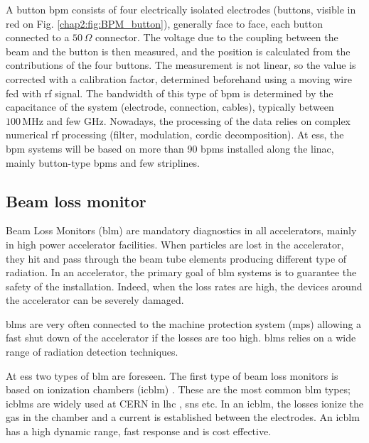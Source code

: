\begin{refsection}
  
  A button \acrshort{bpm} consists of four electrically isolated electrodes (buttons, visible in red on Fig. \ref{chap2:fig:BPM_button}), generally face to face, each button connected to a $50\,\Omega$ connector. The voltage due to the coupling between the beam and the button is then measured, and the position is calculated from the contributions of the four buttons. The measurement is not linear, so the value is corrected with a calibration factor, determined beforehand using a moving wire fed with \acrshort{rf} signal. The bandwidth of this type of \acrshort{bpm} is determined by the capacitance of the system (electrode, connection, cables), typically between $100\,\mathrm{MHz}$ and few GHz. Nowadays, the processing of the data relies on complex numerical \acrshort{rf} processing (filter, modulation, cordic decomposition). At \acrshort{ess}, the \acrshort{bpm} systems will be based on more than 90 \acrshort{bpm}s installed along the linac, mainly button-type \acrshort{bpm}s and few striplines.

  \subsection{Beam loss monitor}
  Beam Loss Monitors (\acrshort{blm}) are mandatory diagnostics in all accelerators, mainly in high power accelerator facilities. When particles are lost in the accelerator, they hit and pass through the beam tube elements producing different type of radiation. In an accelerator, the primary goal of \acrshort{blm} systems is to guarantee the safety of the installation. Indeed, when the loss rates are high, the devices around the accelerator can be severely damaged.

  \acrshort{blm}s are very often connected to the machine protection system (\acrshort{mps}) allowing a fast shut down of the accelerator if the losses are too high. \acrshort{blm}s relies on a wide range of radiation detection techniques.

  At \acrshort{ess} two types of \acrshort{blm} are foreseen. The first type of beam loss monitors is based on ionization chambers (\acrshort{icblm}) \cite{Grishin:IBIC2017-WEPWC03}. These are the most common \acrshort{blm} types; \acrshort{icblm}s are widely used at CERN in \acrshort{lhc} \cite{HOLZER20122055}, \acrshort{sns} etc. In an \acrshort{icblm}, the losses ionize the gas in the chamber and a current is established between the electrodes. An \acrshort{icblm} has a high dynamic range, fast response and is cost effective.


\end{refsection}
